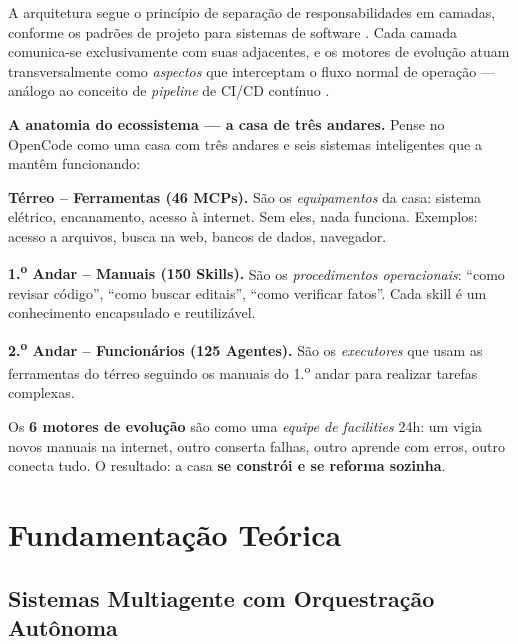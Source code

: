 \documentclass[
  article,
  12pt,
  oneside,
  a4paper,
  brazil,
  sumario=tradicional
]{abntex2}
\begin{document}
A arquitetura segue o princípio de separação de responsabilidades em camadas, conforme os padrões de projeto para sistemas de software \cite{gamma1994design}. Cada camada comunica-se exclusivamente com suas adjacentes, e os motores de evolução atuam transversalmente como \emph{aspectos} que interceptam o fluxo normal de operação --- análogo ao conceito de \emph{pipeline} de CI/CD contínuo \cite{bass2021devops}.

\begin{leigosbox}
\textbf{A anatomia do ecossistema --- a casa de três andares.} Pense no OpenCode como uma casa com três andares e seis sistemas inteligentes que a mantêm funcionando:

\vspace{2pt}
\noindent\textbf{Térreo -- Ferramentas (46 MCPs).} São os \emph{equipamentos} da casa: sistema elétrico, encanamento, acesso à internet. Sem eles, nada funciona. Exemplos: acesso a arquivos, busca na web, bancos de dados, navegador.

\vspace{2pt}
\noindent\textbf{1.\textsuperscript{o} Andar -- Manuais (150 Skills).} São os \emph{procedimentos operacionais}: ``como revisar código'', ``como buscar editais'', ``como verificar fatos''. Cada skill é um conhecimento encapsulado e reutilizável.

\vspace{2pt}
\noindent\textbf{2.\textsuperscript{o} Andar -- Funcionários (125 Agentes).} São os \emph{executores} que usam as ferramentas do térreo seguindo os manuais do 1.\textsuperscript{o} andar para realizar tarefas complexas.

\vspace{4pt}
\noindent Os \textbf{6 motores de evolução} são como uma \emph{equipe de facilities} 24h: um vigia novos manuais na internet, outro conserta falhas, outro aprende com erros, outro conecta tudo. O resultado: a casa \textbf{se constrói e se reforma sozinha}.
\end{leigosbox}

\section{Fundamentação Teórica}

\subsection{Sistemas Multiagente com Orquestração Autônoma}
\end{document}
